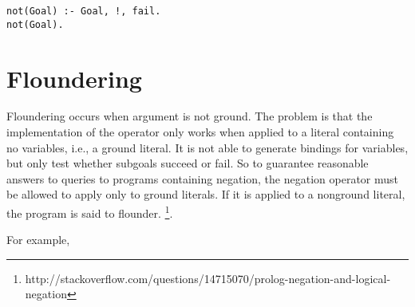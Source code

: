 \begin{verbatim}
not(Goal) :- Goal, !, fail.
not(Goal).
\end{verbatim}

\section{Floundering}
Floundering occurs when argument is not ground.
The problem is that the implementation of the operator \+ only works when applied to a literal containing no variables, i.e., a ground literal. It is not able to generate bindings for variables, but only test whether subgoals succeed or fail. So to guarantee reasonable answers to queries to programs containing negation, the negation operator must be allowed to apply only to ground literals. If it is applied to a nonground literal, the program is said to flounder. \footnote{http://stackoverflow.com/questions/14715070/prolog-negation-and-logical-negation}.

For example, 

